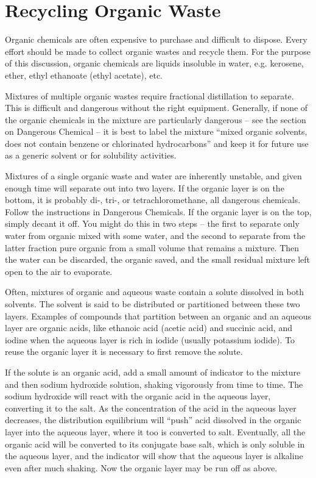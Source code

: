 \chapter{Recycling Organic Waste}

Organic chemicals are often expensive 
to purchase and difficult to dispose. 
Every effort should be made to collect organic wastes and recycle them. 
For the purpose of this discussion, 
organic chemicals are liquids insoluble in water, 
e.g. 
kerosene, 
ether, 
ethyl ethanoate (ethyl acetate), 
etc.

Mixtures of multiple organic wastes 
require fractional distillation to separate. 
This is difficult and dangerous without the right equipment. 
Generally, 
if none of the organic chemicals in the mixture are particularly dangerous – 
see the section on Dangerous Chemical – 
it is best to label the mixture “mixed organic solvents, 
does not contain benzene or chlorinated hydrocarbons” 
and keep it for future use as a generic solvent or for solubility activities.

Mixtures of a single organic waste and water are inherently unstable, 
and given enough time will separate out into two layers. 
If the organic layer is on the bottom, 
it is probably di-, 
tri-, 
or tetrachloromethane, 
all dangerous chemicals. 
Follow the instructions in Dangerous Chemicals. 
If the organic layer is on the top, 
simply decant it off. 
You might do this in two steps – 
the first to separate only water from organic mixed with some water, 
and the second to separate from the latter fraction pure organic 
from a small volume that remains a mixture. 
Then the water can be discarded, 
the organic saved, 
and the small residual mixture left open to the air to evaporate.

Often, 
mixtures of organic and aqueous waste 
contain a solute dissolved in both solvents. 
The solvent is said to be distributed 
or partitioned between these two layers. 
Examples of compounds that partition between an organic 
and an aqueous layer are organic acids, 
like ethanoic acid (acetic acid) and succinic acid, 
and iodine when the aqueous layer is rich in iodide 
(usually potassium iodide). 
To reuse the organic layer it is necessary to first remove the solute.

If the solute is an organic acid, 
add a small amount of indicator to the mixture 
and then sodium hydroxide solution, 
shaking vigorously from time to time. 
The sodium hydroxide will react with the organic acid 
in the aqueous layer, 
converting it to the salt. 
As the concentration of the acid in the aqueous layer decreases, 
the distribution equilibrium will ``push'' acid dissolved 
in the organic layer into the aqueous layer, 
where it too is converted to salt. 
Eventually, 
all the organic acid will be converted to its conjugate base salt, 
which is only soluble in the aqueous layer, 
and the indicator will show that the aqueous layer 
is alkaline even after much shaking. 
Now the organic layer may be run off as above.

